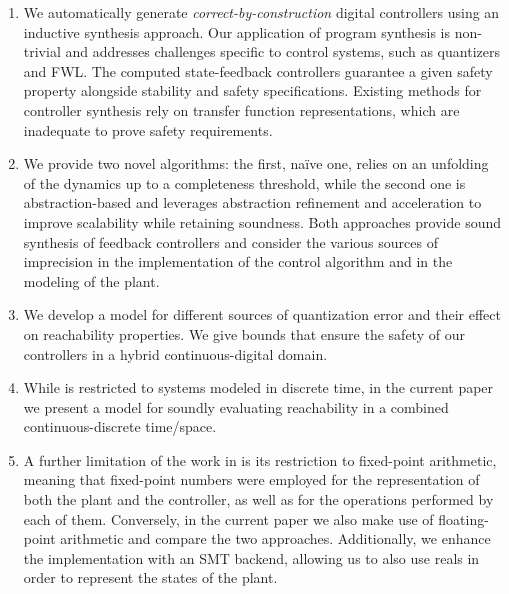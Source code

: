 \documentclass[twocolumn]{autart}    %
\begin{document}
\begin{enumerate}

\item We automatically generate {\em correct-by-construction} digital
  controllers using an inductive synthesis approach.  Our application of program
  synthesis is non-trivial and addresses challenges specific to control
  systems, such as quantizers and FWL.  %
%
  The computed state-feedback controllers 
  guarantee a given safety property alongside stability and safety
  specifications. Existing methods for controller synthesis rely on transfer
  function representations, which are inadequate to prove safety requirements.
%
\item We provide two novel algorithms: the first, na\"ive one, relies on
  an unfolding of the dynamics up to a completeness threshold, while the
  second one is abstraction-based and leverages abstraction refinement and
  acceleration to improve scalability while retaining soundness.  %
  Both approaches provide sound synthesis of
  feedback controllers and consider the various sources of imprecision in
  the implementation of the control algorithm and in the modeling of the
  plant.
%
\item We develop a model for different sources of quantization error and
  their effect on reachability properties.  We give bounds that ensure the
  safety of our controllers in a hybrid continuous-digital domain.

\item While \cite{DBLP:conf/cav/AbateBCCDKKP17} is restricted to systems
  modeled in discrete time, in the current paper we present a model for
  soundly evaluating reachability in a combined continuous-discrete time/space.
\item A further limitation of the work in \cite{DBLP:conf/cav/AbateBCCDKKP17}
  is its restriction to fixed-point arithmetic, meaning that fixed-point numbers
  were employed for the representation of both the plant and the controller, as well as for
  the operations performed by each of them.
  Conversely, in the current paper we also make use of floating-point arithmetic
  and compare the two approaches. Additionally, we enhance the implementation with an SMT backend, allowing us to also use reals in order to represent the states of the plant.
\end{enumerate}
  
\end{document}
